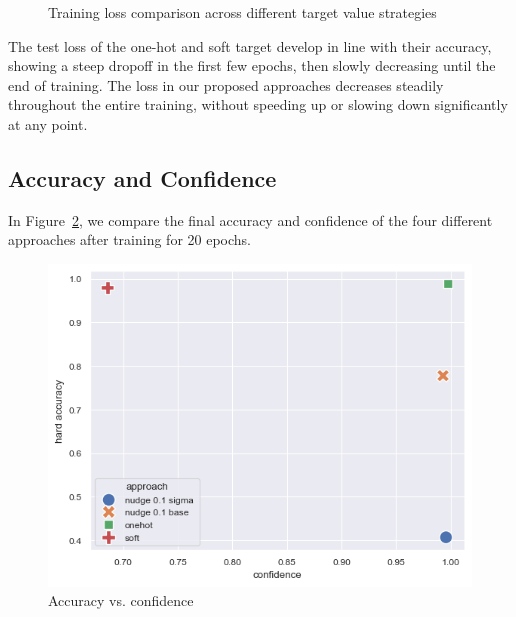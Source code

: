 \documentclass[12pt,fleqn,a4paper]{article}
\begin{document}
\begin{figure}[htbp]
\centering
{}
\hfill
{}
\caption{Training loss comparison across different target value strategies}
\label{fig:loss}
\end{figure}

The test loss of the one-hot and soft target develop in line with their accuracy, showing a steep dropoff in the first few epochs, then slowly decreasing until the end of training. The loss in our proposed approaches decreases steadily throughout the entire training, without speeding up or slowing down significantly at any point.

\subsection{Accuracy and Confidence}
In Figure~\ref{fig:accvconf}, we compare the final accuracy and confidence of the four different approaches after training for 20 epochs.
\begin{figure}[H]
    \centering
    \includegraphics[width=0.5\linewidth]{graphs/accvconf.png}
    \caption{Accuracy vs. confidence}
    \label{fig:accvconf}
\end{figure}
\end{document}
